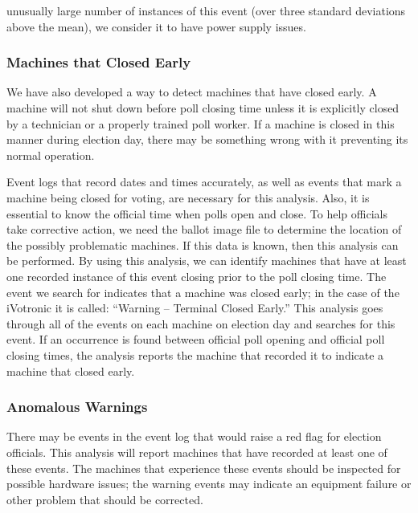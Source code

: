unusually large number of instances of this event (over three standard deviations above the mean), we consider it to have power supply issues.    

\subsubsection{Machines that Closed Early}
We have also developed a way to detect machines that have closed early. A machine will not shut down before poll closing time unless it is explicitly closed by a technician or a properly trained poll worker. If a machine is closed in this manner during election day, there may be something wrong with it preventing its normal operation.
                  
Event logs that record dates and times accurately, as well as events that mark a machine being closed for voting, are necessary for this analysis. Also, it is essential to know the official time when polls open and close. To help officials take corrective action, we need the ballot image file to determine the location of the possibly problematic machines.  If this data is known, then this analysis can be performed. By using this analysis, we can identify machines that have at least one recorded instance of this event closing prior to the poll closing time. The event we search for indicates that a machine was closed early; in the case of the iVotronic it is called: \textquotedblleft Warning -- Terminal Closed Early.\textquotedblright \hspace{2 mm} This analysis goes through all of the events on each machine on election day and searches for this event. If an occurrence is found between official poll opening and official poll closing times, the analysis reports the machine that recorded it to indicate a machine that closed early.  
        
\subsubsection{Anomalous Warnings}
There may be events in the event log that would raise a red flag for election officials. This analysis will report machines that have recorded at least one of these events. The machines that experience these events should be inspected for possible hardware issues; the warning events may indicate an equipment failure or other problem that should be corrected.

